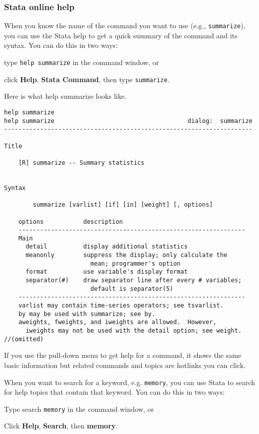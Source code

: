 \subsubsection{Stata online help}
When you know the name of the command you want to use (e.g., \lstinline{summarize}), you can use the Stata help to get a quick summary of the command and its syntax. You can do this in two ways:
\begin{compactenum}
\item type \lstinline{help summarize} in the command window, or
\item click \textbf{Help}, \textbf{Stata Command}, then type \lstinline{summarize}.
\end{compactenum}

Here is what help summarize looks like.
\begin{lstlisting}
help summarize
help summarize                                     dialog:  summarize
---------------------------------------------------------------------

Title

    [R] summarize -- Summary statistics


Syntax

        summarize [varlist] [if] [in] [weight] [, options]

    options           description
    ---------------------------------------------------------------
    Main
      detail          display additional statistics
      meanonly        suppress the display; only calculate the
                        mean; programmer's option
      format          use variable's display format
      separator(#)    draw separator line after every # variables;
                        default is separator(5)
    ---------------------------------------------------------------
    varlist may contain time-series operators; see tsvarlist.
    by may be used with summarize; see by.
    aweights, fweights, and iweights are allowed.  However,
      iweights may not be used with the detail option; see weight.
//(omitted)
\end{lstlisting}

If you use the pull-down menu to get help for a command, it shows the same basic information but related commands and topics are hotlinks you can click.

When you want to search for a keyword, e.g. \lstinline{memory}, you can use Stata to search for help topics that contain that keyword. You can do this in two ways:
\begin{compactenum}
\item Type search \lstinline{memory} in the command window, or
\item Click \textbf{Help}, \textbf{Search}, then \textbf{memory}.
\end{compactenum}

